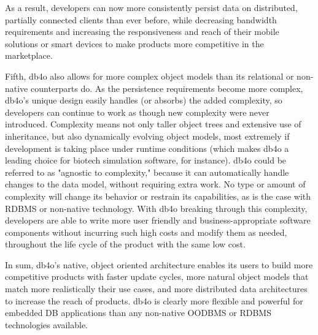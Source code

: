 As a result, developers can now more consistently persist data on distributed, partially connected clients than ever before, while decreasing bandwidth requirements and increasing the responsiveness and reach of their mobile solutions or smart devices to make products more competitive in the marketplace.

Fifth, db4o also allows for more complex object models than its relational or non-native counterparts do. As the persistence requirements become more complex, db4o's unique design easily handles (or absorbs) the added complexity, so developers can continue to work as though new complexity were never introduced. Complexity means not only taller object trees and extensive use of inheritance, but also dynamically evolving object models, most extremely if development is taking place under runtime conditions (which makes db4o a leading choice for biotech simulation software, for instance). db4o could be referred to as "agnostic to complexity," because it can automatically handle changes to the data model, without requiring extra work. No type or amount of complexity will change its behavior or restrain its capabilities, as is the case with RDBMS or non-native technology. With db4o breaking through this complexity, developers are able to write more user friendly and business-appropriate software components without incurring such high costs and modify them as needed, throughout the life cycle of the product with the same low cost.

In sum, db4o's native, object oriented architecture enables its users to build more competitive products with faster update cycles, more natural object models that match more realistically their use cases, and more distributed data architectures to increase the reach of products. db4o is clearly more flexible and powerful for embedded DB applications than any non-native OODBMS or RDBMS technologies available.

